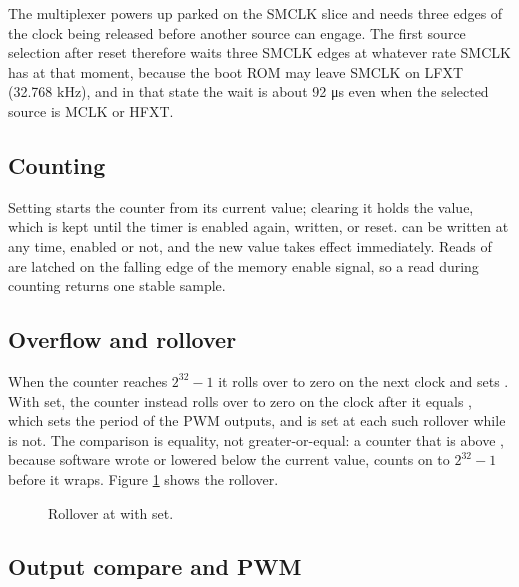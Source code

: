 The multiplexer powers up parked on the SMCLK slice and needs three edges of the clock being released before another source can engage. The first source selection after reset therefore waits three SMCLK edges at whatever rate SMCLK has at that moment, because the boot ROM may leave SMCLK on LFXT (32.768 kHz), and in that state the wait is about 92 \si{\micro\second} even when the selected source is MCLK or HFXT.

\subsection{Counting}

Setting  starts the counter from its current value; clearing it holds the value, which is kept until the timer is enabled again, written, or reset.  can be written at any time, enabled or not, and the new value takes effect immediately. Reads of  are latched on the falling edge of the memory enable signal, so a read during counting returns one stable sample.

\subsection{Overflow and rollover}

When the counter reaches $2^{32} - 1$ it rolls over to zero on the next clock and sets . With  set, the counter instead rolls over to zero on the clock after it equals , which sets the period of the PWM outputs, and  is set at each such rollover while  is not. The comparison is equality, not greater-or-equal: a counter that is above , because software wrote  or lowered  below the current value, counts on to $2^{32} - 1$ before it wraps. Figure \ref{fig:timer-rollover-operation} shows the rollover.

\begin{figure}[htpb]
	\centering
	
	\caption{Rollover at  with  set.}
	\label{fig:timer-rollover-operation}
\end{figure}

\subsection{Output compare and PWM}

